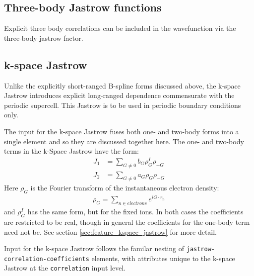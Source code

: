 \subsection{Three-body Jastrow functions}
Explicit three body correlations can be included in the wavefunction via the three-body
jastrow factor.


\subsection{k-space Jastrow}
Unlike the explicitly short-ranged B-spline forms discussed above, the k-space Jastrow introduces explicit long-ranged dependence commensurate with the periodic supercell.  This Jastrow is to be used in periodic boundary conditions only.  

The input for the k-space Jastrow fuses both one- and two-body forms into a single element and so they are discussed together here.  The one- and two-body terms in the k-Space Jastrow have the form:
\begin{align}
  J_1 &= \sum_{G\ne 0}b_G\rho_G^I\rho_{-G} \\
  J_2 &= \sum_{G\ne 0}a_G\rho_G\rho_{-G}
\end{align}
Here $\rho_G$ is the Fourier transform of the instantaneous electron density:
\begin{align}
  \rho_G=\sum_{n\in electrons}e^{iG\cdot r_n}
\end{align}
and $\rho_G^I$ has the same form, but for the fixed ions. In both cases the coefficients are restricted to be real, though in general the coefficients for the one-body term need not be.  See section \ref{sec:feature_kspace_jastrow} for more detail.

Input for the k-space Jastrow follows the familar nesting of \texttt{jastrow-correlation-coefficients} elements, with attributes unique to the k-space Jastrow at the \texttt{correlation} input level.

